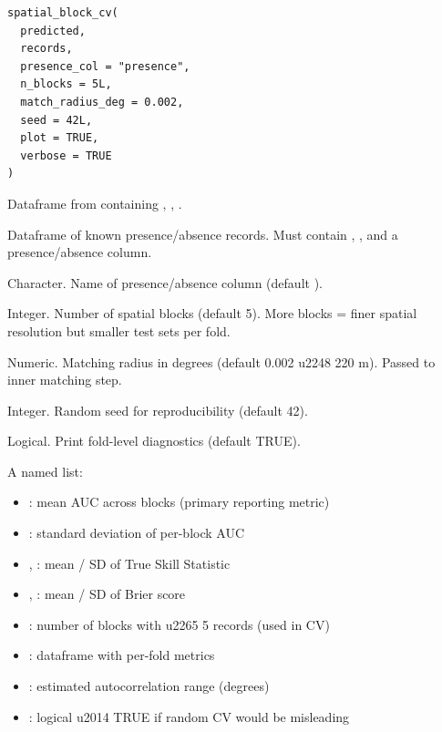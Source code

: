 \documentclass[a4paper]{book}
\begin{document}
%
\begin{Usage}
\begin{verbatim}
spatial_block_cv(
  predicted,
  records,
  presence_col = "presence",
  n_blocks = 5L,
  match_radius_deg = 0.002,
  seed = 42L,
  plot = TRUE,
  verbose = TRUE
)
\end{verbatim}
\end{Usage}
%
\begin{Arguments}
\begin{ldescription}
\item[\code{predicted}] Dataframe from  containing , ,
.

\item[\code{records}] Dataframe of known presence/absence records. Must contain
, , and a presence/absence column.

\item[\code{presence\_col}] Character. Name of presence/absence column (default
).

\item[\code{n\_blocks}] Integer. Number of spatial blocks (default 5). More blocks
= finer spatial resolution but smaller test sets per fold.

\item[\code{match\_radius\_deg}] Numeric. Matching radius in degrees (default 0.002
\bsl{}u2248 220 m). Passed to inner matching step.

\item[\code{seed}] Integer. Random seed for reproducibility (default 42).

\item[\code{verbose}] Logical. Print fold-level diagnostics (default TRUE).
\end{ldescription}
\end{Arguments}
%
\begin{Value}
A named list:
\begin{itemize}

\item{} : mean AUC across blocks (primary reporting metric)
\item{} : standard deviation of per-block AUC
\item{} , : mean / SD of True Skill Statistic
\item{} , : mean / SD of Brier score
\item{} : number of blocks with \bsl{}u2265 5 records (used in CV)
\item{} : dataframe with per-fold metrics
\item{} : estimated autocorrelation range (degrees)
\item{} : logical \bsl{}u2014 TRUE if random CV would be misleading

\end{itemize}

\end{Value}
\end{document}
